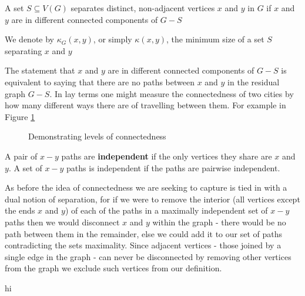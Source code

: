 \begin{defn}
A set $S \subseteq V(G)$ separates distinct, non-adjacent vertices $x$ and $y$ in $G$ if $x$ and $y$ are in different connected components of $G - S$
\end{defn}

\begin{notat}
We denote by $\kappa_G(x,y)$, or simply $\kappa(x,y)$, the minimum size of a set $S$ separating $x$ and $y$
\end{notat} 

The statement that $x$ and $y$ are in different connected components of $G-S$ is equivalent to saying that there are no paths between $x$ and $y$ in the residual graph $G-S$. In lay terms one might measure the connectedness of two cities by how many different ways there are of travelling between them. For example in Figure \ref{fig:towns}

\begin{figure}[h]
\label{fig:towns}

\caption{Demonstrating levels of connectedness}
\end{figure}


\begin{defn}
A pair of $x-y$ paths are \textbf{independent} if the only vertices they share are $x$ and $y$. A set of $x-y$ paths is independent if the paths are pairwise independent.
\end{defn}

As before the idea of connectedness we are seeking to capture is tied in with a dual notion of separation, for if we were to remove the interior (all vertices except the ends $x$ and $y$) of each of the paths in a maximally independent set of $x-y$ paths then we would disconnect $x$ and $y$ within the graph - there would be no path between them in the remainder, else we could add it to our set of paths contradicting the sets maximality. Since adjacent vertices - those joined by a single edge in the graph - can never be disconnected by removing other vertices from the graph we exclude such vertices from our definition. 

\begin{notat}
hi
\end{notat}



\newpage



